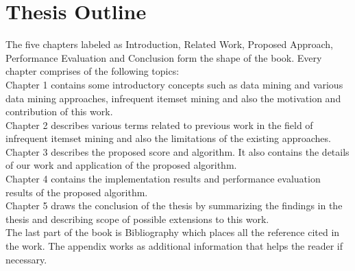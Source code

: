 \section{Thesis Outline}
The five chapters labeled as Introduction, Related Work, Proposed Approach, Performance Evaluation and Conclusion form the shape of the book.
Every chapter comprises of the following topics: \\
%
Chapter 1 contains some introductory concepts such as data mining and various data mining approaches, infrequent itemset mining and also the motivation and contribution of this work.\\
%
Chapter 2 describes various terms related to previous work in the field of infrequent itemset mining and also the limitations of the existing approaches. \\
%
Chapter 3 describes the proposed score and algorithm. It also contains the details of our work and application of the proposed algorithm. \\
%
Chapter 4 contains the implementation results and performance evaluation results of the proposed algorithm. \\
%
Chapter 5 draws the conclusion of the thesis by summarizing the
findings in the thesis and describing scope of possible extensions to this work. \\
%
The last part of the book is Bibliography which places all the reference cited in the work. The appendix works as additional information that helps the reader if necessary.
%
